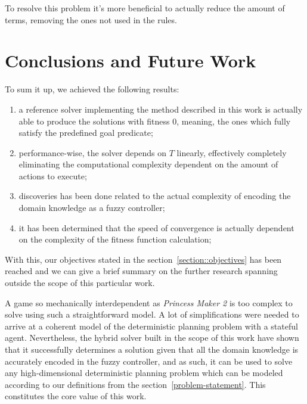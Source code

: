 \documentclass[12pt, a4paper]{report}
\begin{document}
	To resolve this problem it's more beneficial to actually reduce the amount of terms, removing the ones not used in the rules.
	


	
	\chapter{Conclusions and Future Work}\label{section::conclusions}

	To sum it up, we achieved the following results:
	
	\begin{enumerate}
		\item a reference solver implementing the method described in this work is actually able to produce the solutions with fitness 0, meaning, the ones which fully satisfy the predefined goal predicate;
		\item performance-wise, the solver depends on $T$ linearly, effectively completely eliminating the computational complexity dependent on the amount of actions to execute;
		\item discoveries has been done related to the actual complexity of encoding the domain knowledge as a fuzzy controller;
		\item it has been determined that the speed of convergence is actually dependent on the complexity of the fitness function calculation;
	\end{enumerate}
	
	With this, our objectives stated in the section~\ref{section::objectives} has been reached and we can give a brief summary on the further research spanning outside the scope of this particular work.
	
	A game so mechanically interdependent as \textit{Princess Maker 2} is too complex to solve using such a straightforward model.
	A lot of simplifications were needed to arrive at a coherent model of the deterministic planning problem with a stateful agent.
	Nevertheless, the hybrid solver built in the scope of this work have shown that it successfully determines a solution given that all the domain knowledge is accurately encoded in the fuzzy controller, and as such, it can be used to solve any high-dimensional deterministic planning problem which can be modeled according to our definitions from the section~\ref{problem-statement}.
	This constitutes the core value of this work.
	
\end{document}
